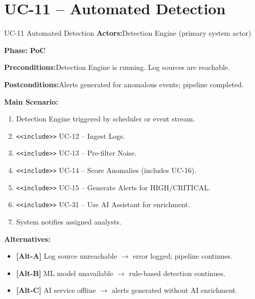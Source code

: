 \documentclass[12pt,a4paper]{report}
\newcommand{\ucfield}[2]{%
    \noindent\textbf{\color{helixpurplemid}#1:}\quad #2\par\medskip
}
\newcommand{\ucphase}[1]{%
    \noindent\textbf{\color{helixpurplemid}Phase:}\quad%
    \ifstrequal{#1}{PoC}{\textcolor{helixteal}{\textbf{PoC}}}{\textcolor{helixamber}{\textbf{Future MVP}}}%
    \par\medskip
}
\begin{document}
\section{UC-11 -- Automated Detection}
\begin{ucbox}{UC-11 \quad Automated Detection}
    \ucfield{Actors}{Detection Engine (primary system actor)}
    \ucphase{PoC}
    \ucfield{Preconditions}{Detection Engine is running. Log sources are reachable.}
    \ucfield{Postconditions}{Alerts generated for anomalous events; pipeline completed.}
    \textbf{\color{helixpurplemid}Main Scenario:}
    \begin{enumerate}
        \item Detection Engine triggered by scheduler or event stream.
        \item \texttt{<<include>>} UC-12 -- Ingest Logs.
        \item \texttt{<<include>>} UC-13 -- Pre-filter Noise.
        \item \texttt{<<include>>} UC-14 -- Score Anomalies (includes UC-16).
        \item \texttt{<<include>>} UC-15 -- Generate Alerts for HIGH/CRITICAL.
        \item \texttt{<<include>>} UC-31 -- Use AI Assistant for enrichment.
        \item System notifies assigned analysts.
    \end{enumerate}
    \textbf{\color{helixpurplemid}Alternatives:}
    \begin{itemize}
        \item \textbf{[Alt-A]} Log source unreachable $\rightarrow$ error logged; pipeline continues.
        \item \textbf{[Alt-B]} ML model unavailable $\rightarrow$ rule-based detection continues.
        \item \textbf{[Alt-C]} AI service offline $\rightarrow$ alerts generated without AI enrichment.
    \end{itemize}
\end{ucbox}
\end{document}

